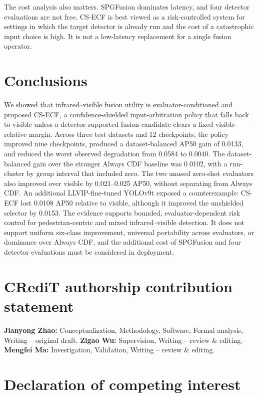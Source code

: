\documentclass[preprint,11pt]{elsarticle}
\begin{document}
The cost analysis also matters. SPGFusion dominates latency, and four detector
evaluations are not free. CS-ECF is best viewed as a risk-controlled system for
settings in which the target detector is already run and the cost of a
catastrophic input choice is high. It is not a low-latency replacement for a
single fusion operator.

\section{Conclusions}

We showed that infrared--visible fusion utility is evaluator-conditioned and
proposed CS-ECF, a confidence-shielded input-arbitration policy that falls back
to visible unless a detector-supported fusion candidate clears a fixed
visible-relative margin. Across three test datasets and 12 checkpoints, the
policy improved nine checkpoints, produced a dataset-balanced AP50 gain of
0.0133, and reduced the worst observed degradation from 0.0584 to 0.0040. The
dataset-balanced gain over the stronger Always CDF baseline was 0.0102, with a
run-cluster by group interval that included zero. The
two unused zero-shot evaluators also improved over visible by 0.021--0.025 AP50,
without separating from Always CDF. An additional LLVIP-fine-tuned YOLOv9t
exposed a counterexample: CS-ECF lost 0.0108 AP50 relative to visible, although
it improved the unshielded selector by 0.0153. The evidence supports bounded,
evaluator-dependent risk control for pedestrian-centric and mixed
infrared--visible detection. It does not support uniform six-class improvement,
universal portability across evaluators, or dominance over Always CDF, and the
additional cost of SPGFusion and four detector evaluations must be considered
in deployment.

\section*{CRediT authorship contribution statement}

\textbf{Jianyong Zhao:} Conceptualization, Methodology, Software, Formal
analysis, Writing -- original draft. \textbf{Zigao Wu:} Supervision, Writing
-- review \& editing. \textbf{Mengfei Ma:} Investigation, Validation,
Writing -- review \& editing.

\section*{Declaration of competing interest}
\end{document}
